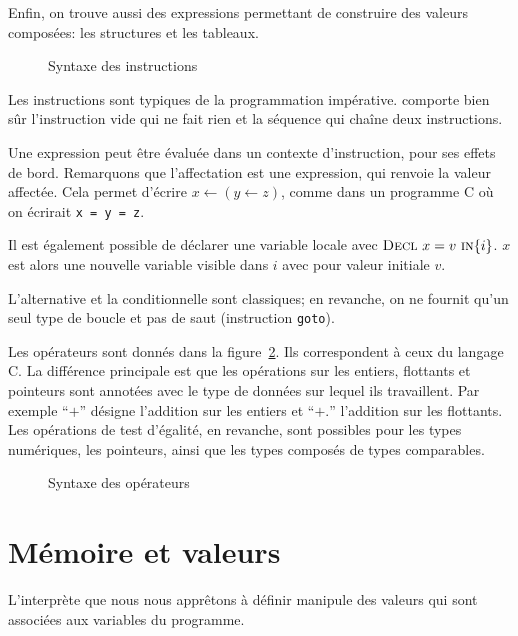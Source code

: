 Enfin, on trouve aussi des expressions permettant de construire des valeurs
composées: les structures et les tableaux.

\begin{figure}%

  \figstxinstr{}

  \caption{Syntaxe des instructions}
\label{fig:stx}
\end{figure}%

Les instructions sont typiques de la programmation impérative. \langname
comporte bien sûr l'instruction vide qui ne fait rien et la séquence qui chaîne
deux instructions.

Une expression peut être évaluée dans un contexte d'instruction, pour ses effets
de bord. Remarquons que l'affectation est une expression, qui renvoie la valeur
affectée. Cela permet d'écrire $x ← (y ← z)$, comme dans un programme C où on
écrirait \texttt{x = y = z}.

Il est également possible de déclarer une variable locale avec
$\textsc{Decl}~x=v~\textsc{in}\{i\}$. $x$ est alors une nouvelle variable visible dans $i$ avec
pour valeur initiale $v$.

L'alternative et la conditionnelle sont classiques; en revanche, on ne fournit
qu'un seul type de boucle et pas de saut (instruction \texttt{goto}).

Les opérateurs sont donnés dans la figure~\ref{fig:stx-ops}. Ils correspondent à
ceux du langage C. La différence principale est que les opérations sur les
entiers, flottants et pointeurs sont annotées avec le type de données sur lequel
ils travaillent. Par exemple \enquote{$+$} désigne l'addition sur les entiers et
\enquote{$+.$} l'addition sur les flottants. Les opérations de test d'égalité,
en revanche, sont possibles pour les types numériques, les pointeurs, ainsi que
les types composés de types comparables.

\begin{figure}[h]%

  \figstxops{}

  \caption{Syntaxe des opérateurs}
\label{fig:stx-ops}
\end{figure}%

\section{Mémoire et valeurs}

L'interprète que nous nous apprêtons à définir manipule des valeurs qui sont
associées aux variables du programme.

